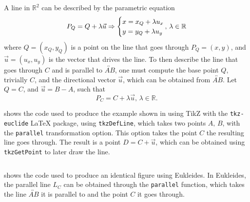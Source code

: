 A line in $\mathbb{R}^2$ can be described by the parametric equation
%
\begin{equation}\label{eq:line.vector.2}
  P_Q = Q + \lambda \vec{u} \Rightarrow \begin{cases}
    x = x_Q + \lambda u_x\\
    y = y_Q + \lambda u_y
  \end{cases}{\hskip -2.5ex}
  ,\,\lambda \in \mathbb{R}
\end{equation}
%
where $Q = (x_Q, y_Q)$ is a point on the line that goes through $P_Q = (x, y)$,
and $\vec{u} = (u_x, u_y)$ is the vector that drives the line.  To then describe
the line that goes through $C$ and is parallel to $\overleftrightarrow{AB}$, one
must compute the base point $Q$, trivially $C$, and the directional vector
$\vec{u}$, which can be obtained from $\overleftrightarrow{AB}$.  Let $Q = C$,
and $\vec{u} = B - A$, such that
\[
  P_C = C + \lambda \vec{u},\,\lambda \in \mathbb{R}.
\]

 shows the code used to produce the
example shown in  using TikZ with the
\texttt{tkz-euclide} \LaTeX{} package, using \texttt{tkzDefLine}, which takes
two points $A,\,B$, with the \texttt{parallel} transformation option.  This
option takes the point $C$ the resulting line goes through.  The result is a
point $D = C + \vec{u}$, which can be obtained using \texttt{tkzGetPoint} to
later draw the line. 

\begin{listing}[htbp]
  \inputminted[highlightlines=3]{latex}{tikz/ex-parallel.tex}
  \caption[Parallel lines example from 
    using \texttt{tkz-euclide}]{%
      Parallel lines example from  using
      \texttt{tkz-euclide}.  The highlighted line shows how to define the line
      $L_C$ parallel to $\overleftrightarrow{AB}$.}
  \label{lst:intro.example.parallel.tikz}
\end{listing}

 shows the code used to produce an
identical figure using Eukleides.  In Eukleides, the parallel line $L_C$ can be
obtained through the \texttt{parallel} function, which takes the line
$\overleftrightarrow{AB}$ it is parallel to and the point $C$ it goes through.

\begin{listing}[htbp]
  \inputminted[highlightlines=3]{text}{euk/ex-parallel.euk}
  \caption[Parallel lines example from 
    using Eukleides]{%
      Parallel lines example from  using
      Eukleides.  The highlighted line shows how to define the line $L_C$
      parallel to $\overleftrightarrow{AB}$.}
  \label{lst:intro.example.parallel.euk}
\end{listing}

